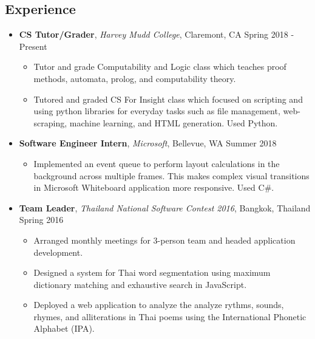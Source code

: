 \documentclass[10.5pt,letterpaper]{article}
\begin{document}
\subsection*{Experience}
  \begin{itemize}
    \parskip=-0.2em

    \item[]
    {\textbf{CS Tutor/Grader}, \textit{Harvey Mudd College}, Claremont, CA \hfill {Spring 2018 - Present}}
    \begin{itemize}[label=\textbullet]
      \itemsep0.1em
      \item Tutor and grade Computability and Logic class which teaches proof methods, automata, prolog,
      and computability theory. 
      \item Tutored and graded CS For Insight class which focused 
      on scripting and using python libraries for everyday tasks such as file management, web-scraping, 
      machine learning, and HTML generation. Used Python.
    \end{itemize}
    
    \item[]
    {\textbf{Software Engineer Intern}, \textit{Microsoft}, Bellevue, WA \hfill {Summer 2018}}
    \begin{itemize}[label=\textbullet]
      \itemsep0.1em
      \item Implemented an event queue to perform layout calculations in the background 
      across multiple frames. This makes complex visual transitions in Microsoft Whiteboard application
      more responsive. Used C\#.
    \end{itemize}
    
    \item[]
    {\textbf{Team Leader}, \textit{Thailand National Software Contest 2016}, Bangkok, Thailand \hfill {Spring 2016}}
    \begin{itemize}[label=\textbullet]
      \itemsep0.1em
      \item Arranged monthly meetings for 3-person team and headed application development.
      \item Designed a system for Thai word segmentation using maximum dictionary matching and exhaustive 
      search in JavaScript.
      \item Deployed a web application to analyze the analyze rythms, sounds, rhymes, and alliterations in Thai 
      poems using the International Phonetic Alphabet (IPA).
      
    \end{itemize}
    

\end{itemize}
\end{document}

